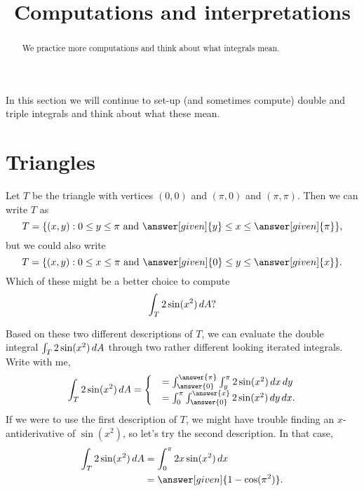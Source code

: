\documentclass{ximera}
\title[Dig-In:]{Computations and interpretations}
\begin{document}
\begin{abstract}
  We practice more computations and think about what integrals mean.
\end{abstract}
\maketitle

In this section we will continue to set-up (and sometimes compute)
double and triple integrals and think about what these mean.

\section{Triangles}

\begin{example}
  Let $T$ be the triangle with vertices $(0,0)$ and $(\pi,0)$ and
  $(\pi,\pi)$.  Then we can write $T$ as
  \[
  T = \{ (x,y)  : 0 \leq y \leq \pi \text{ and } \answer[given]{y} \leq x \leq \answer[given]{\pi} \},
  \]
  but we could also write
  \[
    T = \{ (x,y)  : 0 \leq x \leq \pi \text{ and } \answer[given]{0} \leq y \leq \answer[given]{x} \}.
  \]
  Which of these might be a better choice to compute
  \[
  \int_T 2 \sin(x^2) \mathop{}\!d A?
  \]
  \begin{explanation}
    Based on these two different descriptions of $T$, we can evaluate
    the double integral $\int_T 2 \sin (x^2) \mathop{}\!d A$ through two rather
    different looking iterated integrals.  Write with me,
    \[
    \int_T 2 \sin (x^2) \d A =\begin{cases}
    &= \int_{\answer{0}}^{\answer{\pi}} \int_{y}^\pi 2 \sin (x^2) \d x \d y \\
    &= \int_{0}^\pi \int_{\answer{0}}^{\answer{x}} 2 \sin (x^2) \d y \d x.
    \end{cases}
    \]
    If we were to use the first description of $T$, we might have
    trouble finding an $x$-antiderivative of $\sin (x^2)$, so let's
    try the second description.  In that case,
    \begin{align*}
    \int_T 2 \sin (x^2) \d A &= \int_{0}^\pi 2 x \sin (x^2) \d x\\
    &= \answer[given]{1 - \cos (\pi^2)}.
    \end{align*}
  \end{explanation}
\end{example}
\end{document}
